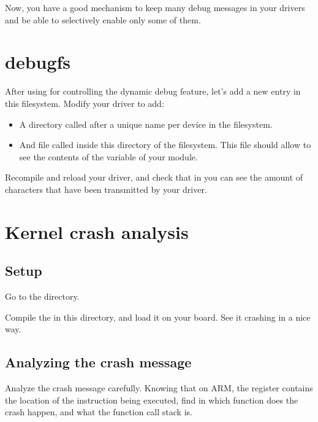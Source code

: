 Now, you have a good mechanism to keep many debug messages in your
drivers and be able to selectively enable only some of them.

\section{debugfs}

After using  for controlling the dynamic debug feature,
let's add a new entry in this filesystem. Modify your driver to
add:

\begin{itemize}

\item A directory called after a unique name per device in the
   filesystem.

\item And file called  inside this directory of the
   filesystem. This file should allow to see the
  contents of the  variable of your module.

\end{itemize}

Recompile and reload your driver, and check that in
 you can see the amount
of characters that have been transmitted by your driver.

\section{Kernel crash analysis}

\subsection{Setup}

Go to the  directory.

Compile the  in this directory, and load it on your
board. See it crashing in a nice way.

\subsection{Analyzing the crash message}

Analyze the crash message carefully. Knowing that on ARM, the 
register contains the location of the instruction being executed, find
in which function does the crash happen, and what the function call
stack is.


